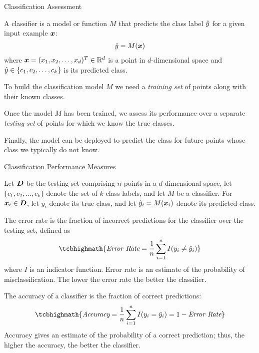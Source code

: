
\date{Chapter 22: Classification Assessment}
\newcommand{\specificity}{\textit{specif\/{i}city}}

\begin{frame}
\titlepage
\end{frame}



\begin{frame}{Classif\/{i}cation Assessment}

A classif\/{i}er is a model or
function $M$ that predicts the class label $\hat{y}$ for a given input
example ${\boldsymbol x}$:
\begin{align*}
  \hat{y} = M({\boldsymbol x})
\end{align*}
where ${\boldsymbol x} = (x_1, x_2, \ldots, x_d)^T \in {\mathord{\mathbb R}}^d$ is a point in
$d$-dimensional space and $\hat{y} \in \{c_1, c_2, \ldots, c_k\}$ is
its predicted class.

\medskip
To build the classif\/{i}cation model $M$ we need a {\em training set} of
points along with their known classes. 

\medskip
Once the model $M$ has been trained,
we assess its performance over a
separate {\em testing set} of points for which we know the
true classes. 

\medskip
F{i}nally, the model
can be deployed to predict the class for future points whose class we
typically do not know.
\end{frame}



\begin{frame}{Classif\/{i}cation Performance Measures}

Let ${\boldsymbol D}$ be the testing set comprising $n$ points in a $d$-dimensional space,
let $\{c_1, c_2, \ldots, c_k\}$ denote the set of $k$ class labels,
and let $M$ be a classif\/{i}er. For ${\boldsymbol x}_i \in {\boldsymbol D}$, let $y_i$ denote
its true class, and let $\hat{y}_i = M({\boldsymbol x}_i)$ denote its predicted class.

The error rate is the fraction
of incorrect predictions for the classif\/{i}er over the testing set,
def\/{i}ned as
\begin{align*}
\tcbhighmath{
  \textit{Error\ Rate} = {1 \over n} \sum_{i=1}^n I(y_i \ne \hy_i)
}
\end{align*}
where $I$ is an indicator function.
Error rate is an estimate of the probability of misclassif\/{i}cation.
The lower the error rate the better the classif\/{i}er.

The accuracy of a classif\/{i}er is
the fraction of correct predictions:
\begin{align*}
\tcbhighmath{
  \textit{Accuracy} ={1\over n} \sum_{i=1}^n I(y_i = \hy_i)  = 1 - \textit{Error\ Rate}
}
\end{align*}
Accuracy gives an estimate of the probability of a correct
prediction; thus, the higher the accuracy, the better the
classif\/{i}er.
\end{frame}



